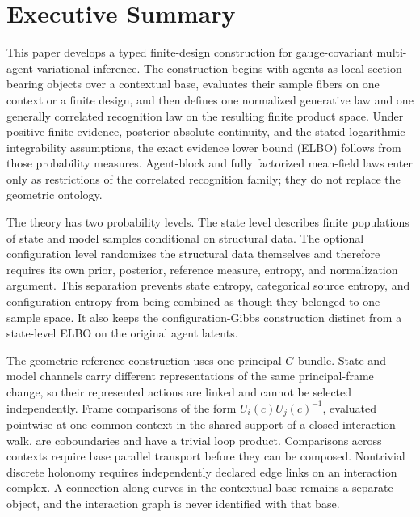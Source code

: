 \usetikzlibrary{arrows.meta,backgrounds,calc,fit,matrix,positioning,shapes.geometric}

\chapter*{Executive Summary}

This paper develops a typed finite-design construction for gauge-covariant multi-agent variational inference. The construction begins with agents as local section-bearing objects over a contextual base, evaluates their sample fibers on one context or a finite design, and then defines one normalized generative law and one generally correlated recognition law on the resulting finite product space. Under positive finite evidence, posterior absolute continuity, and the stated logarithmic integrability assumptions, the exact evidence lower bound (ELBO) follows from those probability measures. Agent-block and fully factorized mean-field laws enter only as restrictions of the correlated recognition family; they do not replace the geometric ontology.

The theory has two probability levels. The state level describes finite populations of state and model samples conditional on structural data. The optional configuration level randomizes the structural data themselves and therefore requires its own prior, posterior, reference measure, entropy, and normalization argument. This separation prevents state entropy, categorical source entropy, and configuration entropy from being combined as though they belonged to one sample space. It also keeps the configuration-Gibbs construction distinct from a state-level ELBO on the original agent latents.

The geometric reference construction uses one principal \(G\)-bundle. State and model channels carry different representations of the same principal-frame change, so their represented actions are linked and cannot be selected independently. Frame comparisons of the form \(U_i(c)U_j(c)^{-1}\), evaluated pointwise at one common context in the shared support of a closed interaction walk, are coboundaries and have a trivial loop product. Comparisons across contexts require base parallel transport before they can be composed. Nontrivial discrete holonomy requires independently declared edge links on an interaction complex. A connection along curves in the contextual base remains a separate object, and the interaction graph is never identified with that base.

